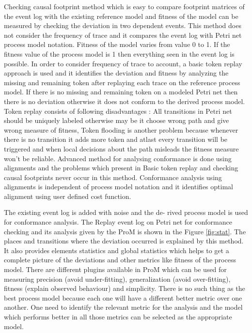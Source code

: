 \begin{bibunit}
   
   Checking causal footprint method which is easy to compare footprint matrices of the event log with the existing reference model and fitness of the model can be measured by checking the deviation in two dependent events. This method does not consider the frequency of trace and it compares the event log with Petri net process model notation. Fitness of the model varies from value 0 to 1. If the fitness value of the process model is 1 then everything seen in the event log is possible. In order to consider frequency of trace to account, a basic token replay approach is used and it identifies the deviation and fitness by analyzing the missing and remaining token after replaying each trace on the reference process model. If there is no missing and remaining token on a modeled Petri net then there is no deviation otherwise it does not conform to the derived process model. Token replay consists of following disadvantages : All transitions in Petri net should be uniquely labeled otherwise may be it choose wrong path and give wrong measure of fitness, Token flooding is another problem because whenever there is no transition it adds more token and atlast every transition will be triggered and when local decisions about the path misleads the fitness measure won’t be reliable. Advanced method for analysing conformance is done using alignments and the problems which present in Basic token replay and checking causal footprints never occur in this method. Conformance analysis using alignments is independent of process model notation and it identifies optimal alignment using user defined cost function.
	
   
   The existing event log is added with noise and the de- rived process model is used for conformance analysis. The Replay event log on Petri net for conformance checking and its analysis given by the ProM is shown in the Figure \ref{fig:stat}. The places and transitions where the deviation occurred is explained by this method. It also provides elements statistics and global statistics which helps to get a complete picture of the deviations and other metrics like fitness of the process model. There are different plugins available in ProM which can be used for measuring precision (avoid under-fitting), generalization (avoid over-fitting), fitness (explain observed behaviour) and simplicity. There is no such thing as the best process model because each one will have a different better metric over one another. One need to identify the relevant metric for the analysis and the model which performs better in all those metrics can be selected as the appropriate model.
   

\end{bibunit}
